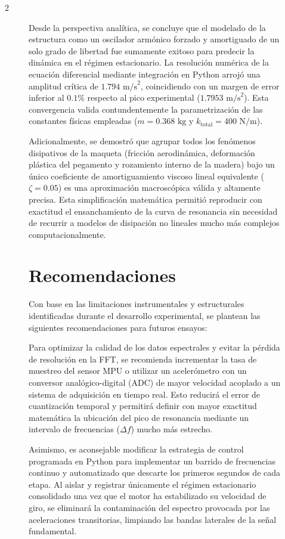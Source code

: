 \documentclass[10pt]{article}
\begin{document}
\begin{multicols}{2}
\begin{figure}[ht]
Desde la perspectiva analítica, se concluye que el modelado de la estructura como un oscilador armónico forzado y amortiguado de un solo grado de libertad fue sumamente exitoso para predecir la dinámica en el régimen estacionario. La resolución numérica de la ecuación diferencial mediante integración en Python arrojó una amplitud crítica de $1.794\text{ m/s}^2$, coincidiendo con un margen de error inferior al $0.1\%$ respecto al pico experimental ($1.7953\text{ m/s}^2$). Esta convergencia valida contundentemente la parametrización de las constantes físicas empleadas ($m = 0.368\text{ kg}$ y $k_{\text{total}} = 400\text{ N/m}$).

Adicionalmente, se demostró que agrupar todos los fenómenos disipativos de la maqueta (fricción aerodinámica, deformación plástica del pegamento y rozamiento interno de la madera) bajo un único coeficiente de amortiguamiento viscoso lineal equivalente ($\zeta = 0.05$) es una aproximación macroscópica válida y altamente precisa. Esta simplificación matemática permitió reproducir con exactitud el ensanchamiento de la curva de resonancia sin necesidad de recurrir a modelos de disipación no lineales mucho más complejos computacionalmente.

\section{Recomendaciones}




Con base en las limitaciones instrumentales y estructurales identificadas durante el desarrollo experimental, se plantean las siguientes recomendaciones para futuros ensayos:

Para optimizar la calidad de los datos espectrales y evitar la pérdida de resolución en la FFT, se recomienda incrementar la tasa de muestreo del sensor MPU o utilizar un acelerómetro con un conversor analógico-digital (ADC) de mayor velocidad acoplado a un sistema de adquisición en tiempo real. Esto reducirá el error de cuantización temporal y permitirá definir con mayor exactitud matemática la ubicación del pico de resonancia mediante un intervalo de frecuencias ($\Delta f$) mucho más estrecho.

Asimismo, es aconsejable modificar la estrategia de control programada en Python para implementar un barrido de frecuencias continuo y automatizado que descarte los primeros segundos de cada etapa. Al aislar y registrar únicamente el régimen estacionario consolidado una vez que el motor ha estabilizado su velocidad de giro, se eliminará la contaminación del espectro provocada por las aceleraciones transitorias, limpiando las bandas laterales de la señal fundamental.


\end{figure}
\end{multicols}
\end{document}
